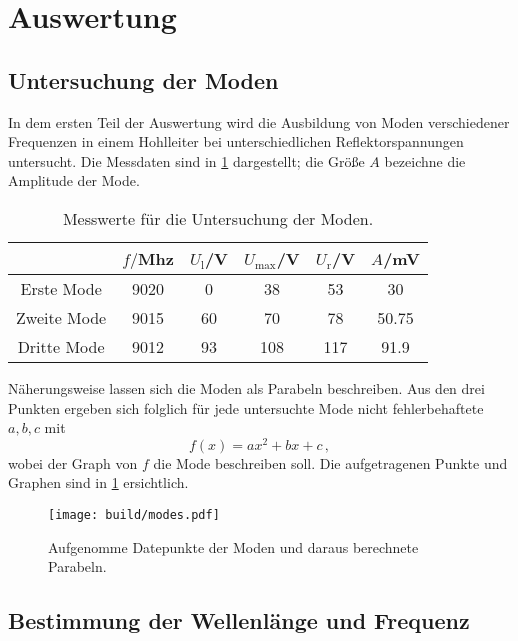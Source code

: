 \section{Auswertung}
\label{sec:Auswertung}

\subsection{Untersuchung der Moden}
\label{subsec:auswertungModen}
In dem ersten Teil der Auswertung wird die Ausbildung von Moden verschiedener Frequenzen in einem Hohlleiter bei unterschiedlichen Reflektorspannungen untersucht. Die Messdaten sind in \ref{tab:moden} dargestellt; die Größe $A$ bezeichne die Amplitude der Mode.\\

\begin{table}
\centering
\caption{Messwerte für die Untersuchung der Moden.}
\label{tab:moden}
\begin{tabular}{c c c c c c}
\toprule
& $f/$Mhz & $U_\text{l}$/V  & $U_\text{max}$/V & $U_\text{r}$/V & $A$/mV \\
\midrule
 Erste Mode & 9020 &  0 & 38  & 53  & 30    \tabularnewline
Zweite Mode & 9015 & 60 & 70  & 78  & 50.75 \tabularnewline
Dritte Mode & 9012 & 93 & 108 & 117 & 91.9  \tabularnewline
\bottomrule
\end{tabular}
\end{table}

Näherungsweise lassen sich die Moden als Parabeln beschreiben. Aus den drei Punkten ergeben sich folglich für jede untersuchte Mode nicht fehlerbehaftete $a, b, c$ mit
\begin{equation}
  f(x) = ax^2 + bx + c\,,
\end{equation}
wobei der Graph von $f$ die Mode beschreiben soll.
Die aufgetragenen Punkte und Graphen sind in \ref{fig:moden} ersichtlich.

\begin{figure}[H]
  \centering
  \texttt{[image: build/modes.pdf]}
  \caption{Aufgenomme Datepunkte der Moden und daraus berechnete Parabeln.}
  \label{fig:moden}
\end{figure}

\subsection{Bestimmung der Wellenlänge und Frequenz}
\label{subsec:auswertungfrequenz}

